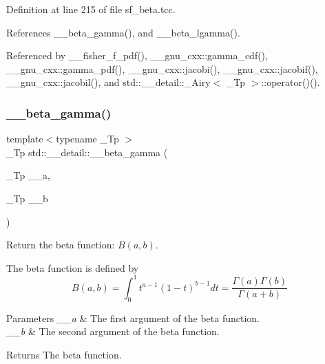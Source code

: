 Definition at line 215 of file sf\+\_\+beta.\+tcc.



References \+\_\+\+\_\+beta\+\_\+gamma(), and \+\_\+\+\_\+beta\+\_\+lgamma().



Referenced by \+\_\+\+\_\+fisher\+\_\+f\+\_\+pdf(), \+\_\+\+\_\+gnu\+\_\+cxx\+::gamma\+\_\+cdf(), \+\_\+\+\_\+gnu\+\_\+cxx\+::gamma\+\_\+pdf(), \+\_\+\+\_\+gnu\+\_\+cxx\+::jacobi(), \+\_\+\+\_\+gnu\+\_\+cxx\+::jacobif(), \+\_\+\+\_\+gnu\+\_\+cxx\+::jacobil(), and std\+::\+\_\+\+\_\+detail\+::\+\_\+\+Airy$<$ \+\_\+\+Tp $>$\+::operator()().

\mbox{\label{namespacestd_1_1____detail_a93cfa67cc3f14564925ed3153e055cd1}} 
\subsubsection{\texorpdfstring{\+\_\+\+\_\+beta\+\_\+gamma()}{\_\_beta\_gamma()}}
{\footnotesize\ttfamily template$<$typename \+\_\+\+Tp $>$ \\
\+\_\+\+Tp std\+::\+\_\+\+\_\+detail\+::\+\_\+\+\_\+beta\+\_\+gamma (\begin{DoxyParamCaption}\item[{\+\_\+\+Tp}]{\+\_\+\+\_\+a,  }\item[{\+\_\+\+Tp}]{\+\_\+\+\_\+b }\end{DoxyParamCaption})}



Return the beta function\+: $ B(a,b) $. 

The beta function is defined by \[ B(a,b) = \int_0^1 t^{a - 1} (1 - t)^{b - 1} dt = \frac{\Gamma(a)\Gamma(b)}{\Gamma(a+b)} \]


\begin{DoxyParams}{Parameters}
{\em \+\_\+\+\_\+a} & The first argument of the beta function. \\
\hline
{\em \+\_\+\+\_\+b} & The second argument of the beta function. \\
\hline
\end{DoxyParams}
\begin{DoxyReturn}{Returns}
The beta function. 
\end{DoxyReturn}


